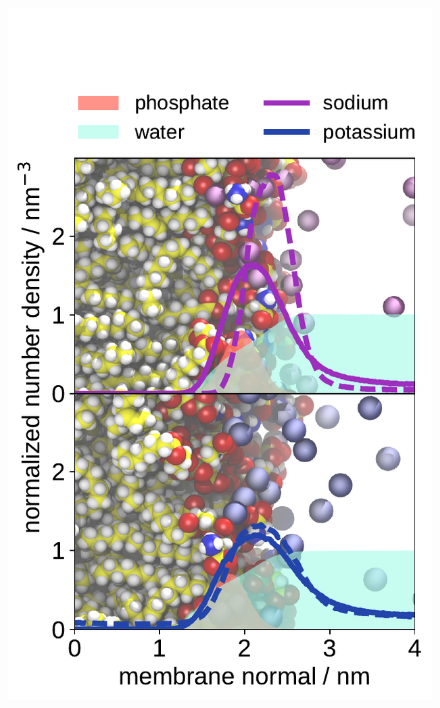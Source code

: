 \documentclass[journal=jpcbfk,manuscript=article]{achemso}
\newlength{\figheight}
\begin{document}
\begin{figure}[tbp!] 
  \centering 
  \includegraphics[height=\figheight]{../img/ecc_pops/density_profiles_na-k-counterions_wat_phos_compar_purePOPS_ecclipids-lipid17.pdf}

\end{figure}
\end{document}
